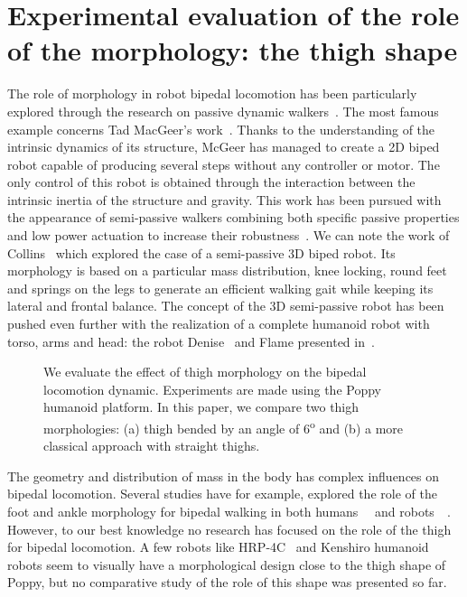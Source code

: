 
\newpage
\section{Experimental evaluation of the role of the morphology: the thigh shape} %
\label{sec:morphology-role}

The role of morphology in robot bipedal locomotion has been particularly explored through the research on passive dynamic walkers~\cite{wisse2007passive}. The most famous example concerns Tad MacGeer's work~\cite{mcgeer1990passive}. Thanks to the understanding of the intrinsic dynamics of its structure, McGeer has managed to create a 2D biped robot capable of producing several steps without any controller or motor.
The only control of this robot is obtained through the interaction between the intrinsic inertia of the structure and gravity.
This work has been pursued with the appearance of semi-passive walkers combining both specific passive properties and low power actuation to increase their robustness~\cite{Anderson2005}. We can note the work of Collins~\cite{collins2005bipedal} which explored the case of a semi-passive 3D biped robot. Its morphology is based on a particular mass distribution, knee locking, round feet and springs on the legs to generate an efficient walking gait while keeping its lateral and frontal balance.
The concept of the 3D semi-passive robot has been pushed even further with the realization of a complete humanoid robot with torso, arms and head: the robot Denise~\cite{wisse2005three} and Flame presented in~\cite{Hobbelen2008}.

\begin{figure}[!t]
\centering
    \hfil
    \caption{We evaluate the effect of thigh morphology on the bipedal locomotion dynamic.
    Experiments are made using the Poppy humanoid platform.
    In this paper, we compare two thigh morphologies: (a) thigh bended by an angle of 6\textsuperscript{o} and (b) a more classical approach with straight thighs.}
    \label{fig:poppy_compared}
\end{figure}


The geometry and distribution of mass in the body has complex influences on bipedal locomotion. Several studies have for example, explored the role of the foot and ankle morphology for bipedal walking in both humans~\cite{Adamczyk2006}~\cite{Hughes1990} and robots~\cite{hobbelen2005ankle}~\cite{Davis2010}. However, to our best knowledge no research has focused on the role of the thigh for bipedal locomotion.  A few robots like HRP-4C~\cite{kaneko2009cybernetic} and Kenshiro humanoid~\cite{nakanishi2013design} robots seem to visually have a morphological design close to the thigh shape of Poppy, but no comparative study of the role of this shape was presented so far.

